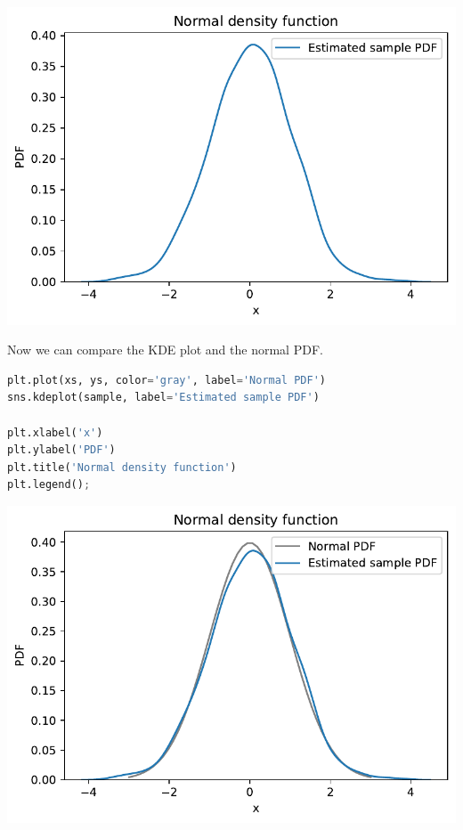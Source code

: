 \begin{center}
\includegraphics[scale=0.75]{chapters/08_distributions_files/08_distributions_125_0.pdf}
\end{center}

Now we can compare the KDE plot and the normal PDF.

\begin{lstlisting}[language=Python]
plt.plot(xs, ys, color='gray', label='Normal PDF')
sns.kdeplot(sample, label='Estimated sample PDF')

plt.xlabel('x')
plt.ylabel('PDF')
plt.title('Normal density function')
plt.legend();
\end{lstlisting}

\begin{center}
\includegraphics[scale=0.75]{chapters/08_distributions_files/08_distributions_127_0.pdf}
\end{center}

